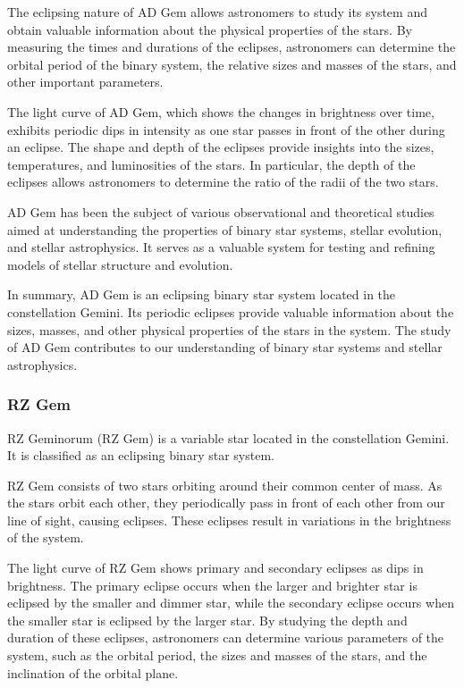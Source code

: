 The eclipsing nature of AD Gem allows astronomers to study its system and obtain valuable information about the physical properties of the stars. By measuring the times and durations of the eclipses, astronomers can determine the orbital period of the binary system, the relative sizes and masses of the stars, and other important parameters.

The light curve of AD Gem, which shows the changes in brightness over time, exhibits periodic dips in intensity as one star passes in front of the other during an eclipse. The shape and depth of the eclipses provide insights into the sizes, temperatures, and luminosities of the stars. In particular, the depth of the eclipses allows astronomers to determine the ratio of the radii of the two stars.

AD Gem has been the subject of various observational and theoretical studies aimed at understanding the properties of binary star systems, stellar evolution, and stellar astrophysics. It serves as a valuable system for testing and refining models of stellar structure and evolution.

In summary, AD Gem is an eclipsing binary star system located in the constellation Gemini. Its periodic eclipses provide valuable information about the sizes, masses, and other physical properties of the stars in the system. The study of AD Gem contributes to our understanding of binary star systems and stellar astrophysics.

\subsubsection*{ RZ Gem }
RZ Geminorum (RZ Gem) is a variable star located in the constellation Gemini. It is classified as an eclipsing binary star system.

RZ Gem consists of two stars orbiting around their common center of mass. As the stars orbit each other, they periodically pass in front of each other from our line of sight, causing eclipses. These eclipses result in variations in the brightness of the system.

The light curve of RZ Gem shows primary and secondary eclipses as dips in brightness. The primary eclipse occurs when the larger and brighter star is eclipsed by the smaller and dimmer star, while the secondary eclipse occurs when the smaller star is eclipsed by the larger star. By studying the depth and duration of these eclipses, astronomers can determine various parameters of the system, such as the orbital period, the sizes and masses of the stars, and the inclination of the orbital plane.

